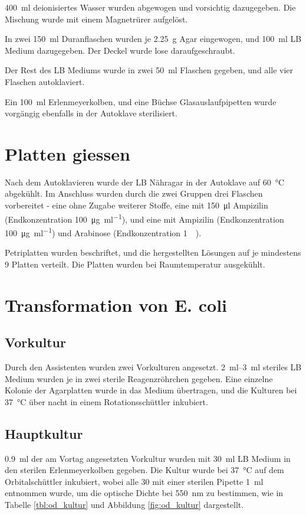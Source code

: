 \documentclass[a4paper,english]{scrreprt}
\begin{document}
\SI{400}{\ml} deionisiertes Wasser wurden abgewogen und vorsichtig dazugegeben.
Die Mischung wurde mit einem Magnetrürer aufgelöst.

In zwei \SI{150}{\ml} Duranflaschen wurden je \SI{2.25}{\g} Agar eingewogen,
und \SI{100}{\ml} LB Medium dazugegeben. Der Deckel wurde lose
daraufgeschraubt.

Der Rest des LB Mediums wurde in zwei \SI{50}{\ml} Flaschen gegeben, und alle
vier Flaschen autoklaviert.

Ein \SI{100}{\ml} Erlenmeyerkolben, und eine Büchse Glasauslaufpipetten wurde
vorgängig ebenfalls in der Autoklave sterilisiert.

\section{Platten giessen}

Nach dem Autoklavieren wurde der LB Nähragar in der Autoklave auf
\SI{60}{\celsius} abgekühlt. Im Anschluss wurden durch die zwei Gruppen drei
Flaschen vorbereitet - eine ohne Zugabe weiterer Stoffe, eine mit \SI{150}{\ul}
Ampizilin (Endkonzentration \SI{100}{\ug \per \ml}), und eine mit Ampizilin
(Endkonzentration \SI{100}{\ug \per \ml}) und Arabinose (Endkonzentration
\SI{1}{\milli\Molar}).

Petriplatten wurden beschriftet, und die hergestellten Lösungen auf je
mindestens 9 Platten verteilt. Die Platten wurden bei Raumtemperatur
ausgekühlt.

\section{Transformation von E. coli}

\subsection{Vorkultur}

Durch den Assistenten wurden zwei Vorkulturen angesetzt. \SIrange{2}{3}{\ml}
steriles LB Medium wurden je in zwei sterile Reagenzröhrchen gegeben. Eine
einzelne Kolonie der Agarplatten wurde in das Medium übertragen, und die
Kulturen bei \SI{37}{\celsius} über nacht in einem Rotationsschüttler
inkubiert.

\subsection{Hauptkultur}

\SI{0.9}{\ml} der am Vortag angesetzten Vorkultur wurden mit \SI{30}{\ml} LB
Medium in den sterilen Erlenmeyerkolben gegeben. Die Kultur wurde bei
\SI{37}{\celsius} auf dem Orbitalschüttler inkubiert, wobei alle \SI{30}{\min}
mit einer sterilen Pipette \SI{1}{\ml} entnommen wurde, um die optische Dichte
bei \SI{550}{\nm} zu bestimmen, wie in Tabelle \ref{tbl:od_kultur} und
Abbildung \ref{fig:od_kultur} dargestellt.
\end{document}
